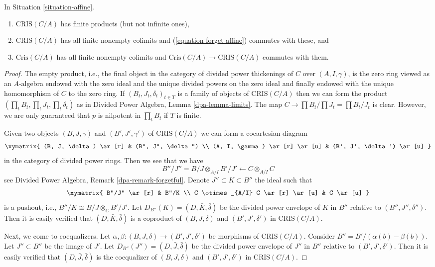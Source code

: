 \begin{lemma}
\label{lemma-affine-thickenings-colimits}
In Situation \ref{situation-affine}.
\begin{enumerate}
\item $\text{CRIS}(C/A)$ has finite products (but not infinite ones),
\item $\text{CRIS}(C/A)$ has all finite nonempty colimits and
(\ref{equation-forget-affine}) commutes with these, and
\item $\text{Cris}(C/A)$ has all finite nonempty colimits and
$\text{Cris}(C/A) \to \text{CRIS}(C/A)$ commutes with them.
\end{enumerate}
\end{lemma}

\begin{proof}
The empty product, i.e., the final object in the category of divided
power thickenings of $C$ over $(A, I, \gamma)$, is the zero ring viewed
as an $A$-algebra endowed with the zero ideal and the unique divided powers
on the zero ideal and finally endowed with the unique homomorphism of $C$ to
the zero ring. If $(B_t, J_t, \delta_t)_{t \in T}$ is a family of objects of
$\text{CRIS}(C/A)$ then we can form the product
$(\prod_t B_t, \prod_t J_t, \prod_t \delta_t)$ as in
Divided Power Algebra, Lemma \ref{dpa-lemma-limits}.
The map $C \to \prod B_t/\prod J_t = \prod B_t/J_t$ is clear.
However, we are only guaranteed that $p$ is nilpotent in $\prod_t B_t$
if $T$ is finite.

\medskip\noindent
Given two objects $(B, J, \gamma)$ and $(B', J', \gamma')$ of
$\text{CRIS}(C/A)$ we can form a cocartesian diagram
$$
\xymatrix{
(B, J, \delta) \ar[r] & (B'', J'', \delta'') \\
(A, I, \gamma) \ar[r] \ar[u] & (B', J', \delta') \ar[u]
}
$$
in the category of divided power rings. Then we see that we have
$$
B''/J'' = B/J \otimes_{A/I} B'/J' \longleftarrow C \otimes_{A/I} C
$$
see Divided Power Algebra, Remark \ref{dpa-remark-forgetful}.
Denote $J'' \subset K \subset B''$
the ideal such that
$$
\xymatrix{
B''/J'' \ar[r] & B''/K \\
C \otimes_{A/I} C \ar[r] \ar[u] & C \ar[u]
}
$$
is a pushout, i.e., $B''/K \cong B/J \otimes_C B'/J'$.
Let $D_{B''}(K) = (D, \bar K, \bar \delta)$
be the divided power envelope of $K$ in $B''$ relative to
$(B'', J'', \delta'')$. Then it is easily verified that
$(D, \bar K, \bar \delta)$ is a coproduct of $(B, J, \delta)$ and
$(B', J', \delta')$ in $\text{CRIS}(C/A)$.

\medskip\noindent
Next, we come to coequalizers. Let
$\alpha, \beta : (B, J, \delta) \to (B', J', \delta')$ be morphisms of
$\text{CRIS}(C/A)$. Consider $B'' = B'/ (\alpha(b) - \beta(b))$. Let
$J'' \subset B''$ be the image of $J'$. Let
$D_{B''}(J'') = (D, \bar J, \bar\delta)$ be the divided power envelope of
$J''$ in $B''$ relative to $(B', J', \delta')$. Then it is easily verified
that $(D, \bar J, \bar \delta)$ is the coequalizer of $(B, J, \delta)$ and
$(B', J', \delta')$ in $\text{CRIS}(C/A)$.


\end{proof}
